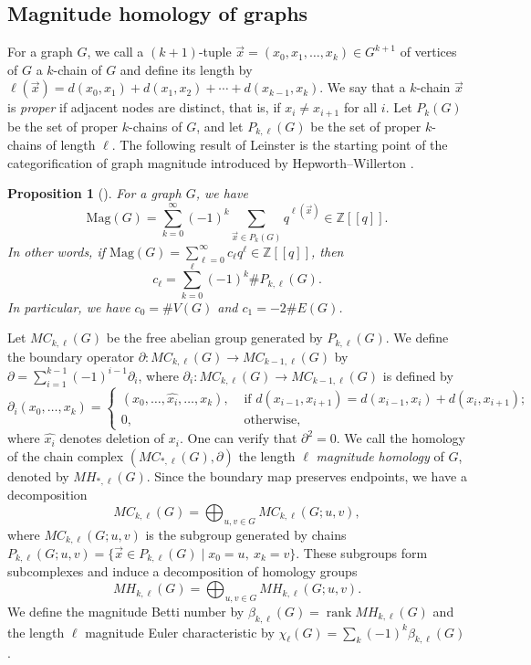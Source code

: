 \documentclass{amsart}
\numberwithin{equation}{section}
\newtheorem{prop}[thm]{Proposition}
\theoremstyle{plain}
\theoremstyle{remark}
\theoremstyle{definition}
\numberwithin{equation}{section}
\newcommand{\Z}{\mathbb{Z}}
\newcommand{\Mag}{\mathrm{Mag}}
\DeclareMathOperator{\rank}{rank}
\begin{document}
\subsection{Magnitude homology of graphs}
For a graph $G$, we call a $(k+1)$-tuple $\Vec{x}=(x_0,x_1,\ldots,x_k)\in G^{k+1}$ of vertices of $G$ a $k$-chain of $G$ and define its length by $\ell(\Vec{x})=d(x_0,x_1)+d(x_1,x_2)+\cdots+d(x_{k-1},x_k)$. We say that a $k$-chain $\Vec{x}$ is \emph{proper} if adjacent nodes are distinct, that is, if $x_i\neq x_{i+1}$ for all $i$. Let $P_{k}(G)$ be the set of proper $k$-chains of $G$, and let $P_{k,\ell}(G)$ be the set of proper $k$-chains of length $\ell$. The following result of Leinster is the starting point of the categorification of graph magnitude introduced by Hepworth--Willerton \cite{Hepworth2017}.


\begin{prop}[{\cite[Proposition 3.9]{Leinster2019}}]\label{coeff}
    For a graph $G$, we have
    \[
    \Mag(G)=\sum_{k=0}^{\infty}(-1)^k\sum_{\Vec{x}\in P_k(G)}q^{\ell(\Vec{x})}\in \Z[\![q]\!].
    \]
    In other words, if $\Mag(G)=\sum_{\ell=0}^{\infty}c_{\ell}q^{\ell}\in \Z[\![q]\!]$, then
    \[
    c_{\ell}=\sum_{k=0}^{\ell}(-1)^k\#P_{k,\ell}(G).
    \]
    In particular, we have $c_0=\#V(G)$ and $c_1=-2\#E(G)$.
\end{prop}

Let $MC_{k,\ell}(G)$ be the free abelian group generated by $P_{k,\ell}(G)$. We define the boundary operator $\partial:MC_{k,\ell}(G)\to MC_{k-1,\ell}(G)$ by $\partial=\sum_{i=1}^{k-1}(-1)^{i-1}\partial_i$, where $\partial_i:MC_{k,\ell}(G)\to MC_{k-1,\ell}(G)$ is defined by
\[
    \partial_i(x_0,\ldots,x_k)=\begin{cases}
    (x_0,\ldots,\widehat{x_i},\ldots,x_k), & \text{ if } d(x_{i-1},x_{i+1})=d(x_{i-1},x_i)+d(x_i,x_{i+1});\\
    0, & \text{ otherwise},
\end{cases}
\]
where $\widehat{x_i}$ denotes deletion of $x_i$. One can verify that $\partial^2=0$.
We call the homology of the chain complex $(MC_{*,\ell}(G),\partial)$ the length $\ell$ \emph{magnitude homology} of $G$, denoted by $MH_{*,\ell}(G)$. Since the boundary map preserves endpoints, we have a decomposition
\[
MC_{k,\ell}(G)=\bigoplus_{u,v\in G}MC_{k,\ell}(G;u,v),
\]
where $MC_{k,\ell}(G;u,v)$ is the subgroup generated by chains $P_{k,\ell}(G;u,v)=\{\Vec{x}\in P_{k,\ell}(G)\mid x_0=u,\ x_k=v\}$. These subgroups form subcomplexes and induce a decomposition of homology groups
\begin{equation}
    MH_{k,\ell}(G)=\bigoplus_{u,v\in G}MH_{k,\ell}(G;u,v). \label{vertexdecomp}
\end{equation}
We define the magnitude Betti number by $\beta_{k,\ell}(G)=\rank MH_{k,\ell}(G)$ and the length $\ell$ magnitude Euler characteristic by $\chi_{\ell}(G)=\sum_k(-1)^k\beta_{k,\ell}(G)$.
\end{document}
